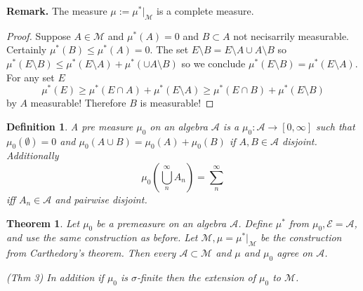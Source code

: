 \documentclass[letter]{article}
\newtheorem{theorem}{Theorem}
\newtheorem{definition}{Definition}
\def\scriptm{{\mathcal M}}
\def\scripte{{\mathcal E}}
\def\scripta{{\mathcal A}}
\begin{document}
\noindent \textbf{Remark.} The measure $\mu := \mu^*|_\scriptm$ is a complete measure.
\begin{proof}
	Suppose $A \in \scriptm$ and $\mu^*(A) = 0$ and $B \subset A$ not necisarrily measurable. Certainly $\mu^*(B) \leq \mu^*(A) = 0.$ The set $E \setminus B = E \setminus A \cup A \setminus B$ so $\mu^*(E \setminus B) \leq \mu^*( E \setminus A) + \mu^*( \cup A \setminus B)$ so we conclude 
	$\mu^*(E \setminus B) = \mu^*(E \setminus A)$. For any set $E$
	\begin{equation*}
		\mu^*(E) \geq \mu^*(E \cap A) + \mu^*(E \setminus A) \geq \mu^*(E \cap B) + \mu^*(E \setminus B)
	\end{equation*}
	by $A$ measurable! Therefore $B$ is measurable!
\end{proof}

\begin{definition}
	A pre measure $\mu_0$ on an algebra $\scripta$ is a $\mu_0: \scripta \to [0, \infty]$ such that $\mu_0(\emptyset) = 0$ and $\mu_0(A \cup B) = \mu_0(A) + \mu_0(B)$ if $A,B \in \scripta$ disjoint. Additionally
	\begin{equation*}
		\mu_0\left(\bigcup_n^\infty A_n\right) = \sum_{n}^\infty
	\end{equation*}
	iff $A_n \in \scripta$ and pairwise disjoint.
\end{definition}
\begin{theorem}
	Let $\mu_0$ be a premeasure on an algebra $\scripta$. Define $\mu^*$ from $\mu_0, \scripte = \scripta$, and use the same construction as before. Let $\scriptm, \mu = \mu^*|_\scriptm$ be the construction from Carthedory's theorem. Then every $\scripta \subset \scriptm$ and $\mu$ and $ \mu_0$ agree on $\scripta$.

	(Thm 3) In addition if $\mu_0$ is $\sigma$-finite then the extension of $\mu_0$ to $\scriptm$.
\end{theorem}
\end{document}
